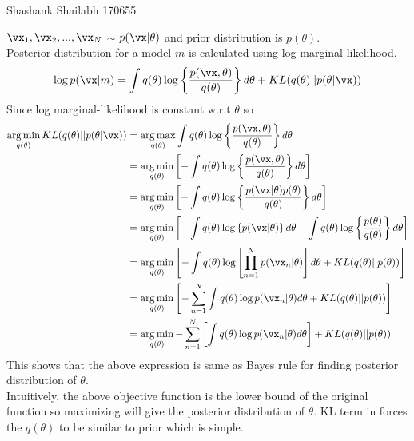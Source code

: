 \documentclass[a4paper,11pt]{article}
\begin{document}
{Shashank Shailabh}   %
{170655}	%

\begin{pmisolution}
\(\vx_1, \vx_2,...,\vx_N\) \(\sim\) \(p(\vx|\theta)\) and prior distribution is \(p(\theta)\).\\
Posterior distribution for a model \(m\) is calculated using log marginal-likelihood.
\[\log p(\vx|m) = \int q(\theta)\log \left\{ \frac{p(\vx,\theta)}{q(\theta)}\right\}d\theta + KL(q(\theta)|| p(\theta|\vx))\]
Since log marginal-likelihood is constant w.r.t \(\theta\) so
\begin{align*}
    \argmin_{q(\theta)} KL(q(\theta)|| p(\theta|\vx)) &= \argmax_{q(\theta)} \int q(\theta)\log \left\{ \frac{p(\vx,\theta)}{q(\theta)}\right\}d\theta\\
    &= \argmin_{q(\theta)} \left[- \int q(\theta)\log \left\{ \frac{p(\vx, \theta)}{q(\theta)}\right\}d\theta \right]\\
    & = \argmin_{q(\theta)} \left[- \int q(\theta)\log \left\{ \frac{p(\vx|\theta)p(\theta)}{q(\theta)}\right\}d\theta\right]\\
    & = \argmin_{q(\theta)} \left[ - \int q(\theta)\log \left\{p(\vx|\theta)\right\}d\theta - \int q(\theta)\log \left\{ \frac{p(\theta)}{q(\theta)}\right\}d\theta\right]\\
    &= \argmin_{q(\theta)} \left[ - \int q(\theta)\log \left[ \prod_{n=1}^{N} p(\vx_n|\theta)\right]d\theta + KL(q(\theta)||p(\theta))\right]\\
    &= \argmin_{q(\theta)} \left[ - \sum_{n=1}^{N} \int q(\theta)\log p(\vx_n|\theta)d\theta + KL(q(\theta)||p(\theta))\right]\\
    &= \argmin_{q(\theta)} - \sum_{n=1}^{N} \left[\int q(\theta)\log p(\vx_n|\theta)d\theta\right] + KL(q(\theta)||p(\theta))\\
\end{align*}
This shows that the above expression is same as Bayes rule for finding posterior distribution of \(\theta\). \\
Intuitively, the above objective function is the lower bound of the original function so maximizing will give the posterior distribution of \(\theta\). KL term in forces the \(q(\theta)\) to be similar to prior which is simple.

\end{pmisolution}
\end{document}
